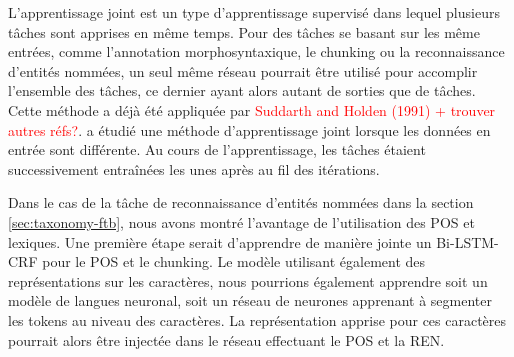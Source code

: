 \documentclass[PhD-Yoann-Dupont.tex]{subfiles}
\begin{document}
L'apprentissage joint est un type d'apprentissage supervisé dans lequel plusieurs tâches sont apprises en même temps. Pour des tâches se basant sur les même entrées, comme l'annotation morphosyntaxique, le chunking ou la reconnaissance d'entités nommées, un seul même réseau pourrait être utilisé pour accomplir l'ensemble des tâches, ce dernier ayant alors autant de sorties que de tâches. Cette méthode a déjà été appliquée par \textcolor{red}{Suddarth and Holden (1991) + trouver autres réfs?}. \citet{collobert2011natural} a étudié une méthode d'apprentissage joint lorsque les données en entrée sont différente. Au cours de l'apprentissage, les tâches étaient successivement entraînées les unes après au fil des itérations.

Dans le cas de la tâche de reconnaissance d'entités nommées dans la section \ref{sec:taxonomy-ftb}, nous avons montré l'avantage de l'utilisation des POS et lexiques. Une première étape serait d'apprendre de manière jointe un Bi-LSTM-CRF pour le POS et le chunking. Le modèle utilisant également des représentations sur les caractères, nous pourrions également apprendre soit un modèle de langues neuronal, soit un réseau de neurones apprenant à segmenter les tokens au niveau des caractères. La représentation apprise pour ces caractères pourrait alors être injectée dans le réseau effectuant le POS et la REN.
\end{document}
